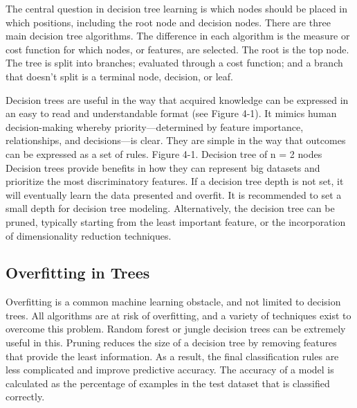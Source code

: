 \documentclass[12pt]{article}
\begin{document}
The central question in decision tree learning is which nodes should
be placed in which positions, including the root node and decision nodes.
There are three main decision tree algorithms. The difference in each
algorithm is the measure or cost function for which nodes, or features, are
selected. The root is the top node. The tree is split into branches; evaluated
through a cost function; and a branch that doesn’t split is a terminal node,
decision, or leaf.


Decision trees are useful in the way that acquired knowledge can be
expressed in an easy to read and understandable format (see Figure 4-1).
It mimics human decision-making whereby priority—determined by
feature importance, relationships, and decisions—is clear. They are simple
in the way that outcomes can be expressed as a set of rules.
Figure 4-1. Decision tree of n = 2 nodes
Decision trees provide benefits in how they can represent big
datasets and prioritize the most discriminatory features. If a decision tree
depth is not set, it will eventually learn the data presented and overfit.
It is recommended to set a small depth for decision tree modeling.
Alternatively, the decision tree can be pruned, typically starting from the
least important feature, or the incorporation of dimensionality reduction
techniques.

\subsection{Overfitting in Trees}
Overfitting is a common machine learning obstacle, and not limited
to decision trees. All algorithms are at risk of overfitting, and a variety
of techniques exist to overcome this problem. Random forest or jungle
decision trees can be extremely useful in this.
Pruning reduces the size of a decision tree by removing features that
provide the least information. As a result, the final classification rules are
less complicated and improve predictive accuracy.
The accuracy of a model is calculated as the percentage of examples in
the test dataset that is classified correctly.
\end{document}

